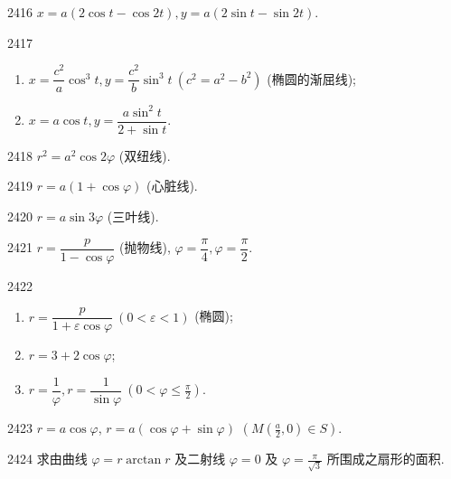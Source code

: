 \begin{prob}[S]{2416}
$x = a(2\cos t - \cos 2t), y = a(2\sin t - \sin 2t)$.
\end{prob}

\begin{prob}[M]{2417}
\begin{enumerate}[label=(\alph*), itemsep=2pt, topsep=3pt]
\item $x = \dfrac{c^2}{a} \cos^3 t, y = \dfrac{c^2}{b} \sin^3 t\ (c^2 = a^2 - b^2)$ (椭圆的渐屈线);
\item $x = a \cos t, y = \dfrac{a \sin^2 t}{2 + \sin t}$.
\end{enumerate}
\end{prob}


\begin{prob}[S]{2418}
$r^2 = a^2 \cos 2\varphi$ (双纽线).
\end{prob}

\begin{prob}[S]{2419}
$r = a(1 + \cos \varphi)$ (心脏线).
\end{prob}

\begin{prob}[S]{2420}
$r = a \sin 3\varphi$ (三叶线).
\end{prob}

\begin{prob}[S]{2421}
$r = \dfrac{p}{1 - \cos \varphi}$ (抛物线), $\varphi = \dfrac{\pi}{4}, \varphi = \dfrac{\pi}{2}$.
\end{prob}

\begin{prob}[L]{2422}
\begin{enumerate}[label=(\alph*), itemsep=2pt, topsep=3pt]
\item $r = \dfrac{p}{1 + \varepsilon \cos \varphi}\ (0 < \varepsilon < 1)$ (椭圆);
\item $r = 3 + 2\cos \varphi$;
\item $r = \dfrac{1}{\varphi}, r = \dfrac{1}{\sin \varphi}\ \left(0 < \varphi \leqslant \frac{\pi}{2}\right)$.
\end{enumerate}
\end{prob}

\begin{prob}[S]{2423}
$r = a\cos\varphi$, $r = a(\cos\varphi + \sin\varphi)$ $\left(M\left(\frac{a}{2}, 0\right) \in S\right)$.
\end{prob}

\begin{prob}[S]{2424}
求由曲线 $\varphi = r\arctan r$ 及二射线 $\varphi = 0$ 及 $\varphi = \frac{\pi}{\sqrt{3}}$ 所围成之扇形的面积.
\end{prob}

